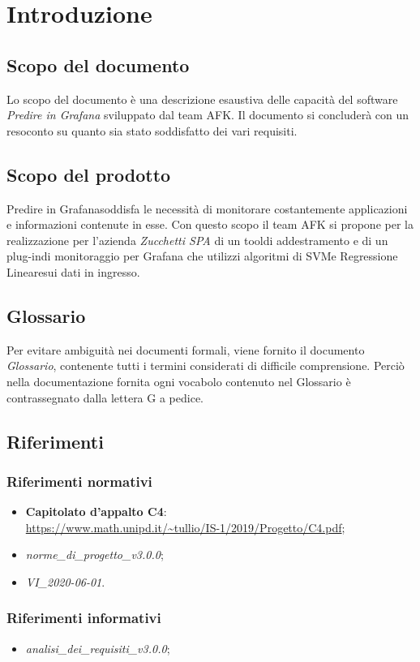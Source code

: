 \section{Introduzione}

\subsection{Scopo del documento}
Lo scopo del documento è una descrizione esaustiva delle capacità del software \textit{Predire in Grafana} sviluppato dal team AFK.
Il documento si concluderà con un resoconto su quanto sia stato soddisfatto dei vari requisiti.

\subsection{Scopo del prodotto}
Predire in Grafana\glo soddisfa le necessità di monitorare costantemente applicazioni e informazioni contenute in esse. 
Con questo scopo il team AFK si propone per la realizzazione per l’azienda \textit{Zucchetti SPA} di un tool\glo di addestramento e di un plug-in\glo di monitoraggio per Grafana che utilizzi algoritmi di SVM\glo e Regressione Lineare\glo sui dati in ingresso.


\subsection{Glossario}
Per evitare ambiguità nei documenti formali, viene fornito il documento \textit{Glossario}, contenente tutti i termini considerati di difficile comprensione. Perciò nella documentazione fornita ogni vocabolo contenuto nel Glossario è contrassegnato dalla lettera G a pedice.

\subsection{Riferimenti}

\subsubsection{Riferimenti normativi}
\begin{itemize}
	\item \textbf{Capitolato d'appalto C4}: \\
	\url{https://www.math.unipd.it/~tullio/IS-1/2019/Progetto/C4.pdf};
	\item \textit{norme\_di\_progetto\_v3.0.0};
	\item \textit{VI\_2020-06-01}.
\end{itemize}

\subsubsection{Riferimenti informativi}
\begin{itemize}
	\item \textit{analisi\_dei\_requisiti\_v3.0.0};
\end{itemize}
